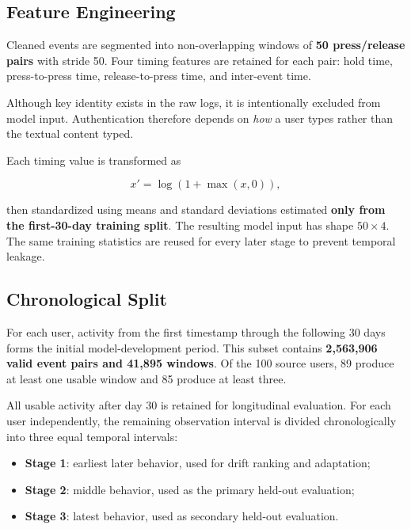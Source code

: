 \documentclass[conference]{IEEEtran}
\begin{document}
\subsection{Feature Engineering}

Cleaned events are segmented into non-overlapping windows of \textbf{50 press/release pairs} with stride 50. Four timing features are retained for each pair: hold time, press-to-press time, release-to-press time, and inter-event time.

Although key identity exists in the raw logs, it is intentionally excluded from model input. Authentication therefore depends on \textit{how} a user types rather than the textual content typed.

Each timing value is transformed as

\begin{equation}
x'=\log(1+\max(x,0)),
\label{eq:transform}
\end{equation}

then standardized using means and standard deviations estimated \textbf{only from the first-30-day training split}. The resulting model input has shape $50\times4$. The same training statistics are reused for every later stage to prevent temporal leakage.

\subsection{Chronological Split}

For each user, activity from the first timestamp through the following 30 days forms the initial model-development period. This subset contains \textbf{2,563,906 valid event pairs and 41,895 windows}. Of the 100 source users, 89 produce at least one usable window and 85 produce at least three.

All usable activity after day 30 is retained for longitudinal evaluation. For each user independently, the remaining observation interval is divided chronologically into three equal temporal intervals:

\begin{itemize}
    \item \textbf{Stage 1}: earliest later behavior, used for drift ranking and adaptation;
    \item \textbf{Stage 2}: middle behavior, used as the primary held-out evaluation;
    \item \textbf{Stage 3}: latest behavior, used as secondary held-out evaluation.
\end{itemize}
\end{document}
